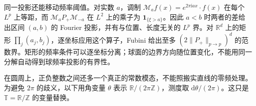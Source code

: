 \ProseParagraphBreak

同一投影还能移动频率阈值。对实数 \(a\)，调制 \(\mathcal M_a f(x)=e^{2\pi\mathrm iax}\cdot f(x)\) 在每个 \(L^p\) 上等距，而 \(\mathcal M_aP_+\mathcal M_{-a}\) 在 \(L^2\) 上的乘子为 \(\mathbf1_{\{\xi>a\}}\)。因此 \(a<b\) 时两者的差给出区间 \((a,b)\) 的 Fourier 投影，并有与位置、长度无关的 \(L^p\) 界。对 \(\mathbb R^d\) 上的矩形 \(\prod_j(a_j,b_j)\)，逐坐标应用这个算子，Fubini 给出至多 \((2\|P_+\|_{p\rightarrow p})^d\) 的范数界。矩形的频率条件可以逐坐标分离；球面的边界方向随位置变化，不能用同一分解自动得到球频率投影的有界性。

\ProseParagraphBreak

在圆周上，正负整数之间还多一个真正的常数模态，不能照搬实直线的零频处理。为避免 \(2\pi\) 的歧义，以下用角变量 \(\theta\) 表示 \(\mathbb R/(2\pi\mathbb Z)\)，测度取 \(\mathrm d\theta/(2\pi)\)。这只是 \(\mathbb T=\mathbb R/\mathbb Z\) 的变量替换。

